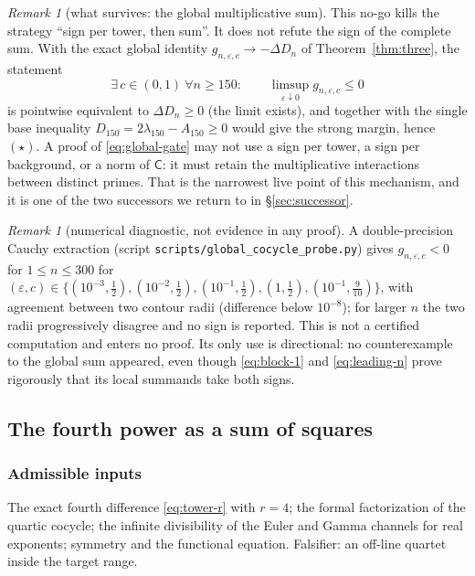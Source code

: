 \documentclass[11pt]{amsart}
\theoremstyle{definition}
\theoremstyle{remark}
\newtheorem{remark}[theorem]{Remark}
\theoremstyle{definition}
\newcommand{\eps}{\varepsilon}
\newcommand{\Cc}{\mathsf{C}}
\begin{document}
\begin{remark}[what survives: the global multiplicative sum]\label{rmk:tower-alive}
This no-go kills the strategy ``sign per tower, then sum''. It does not refute the sign of the
complete sum. With the exact global identity
$g_{n,\eps,c}\to-\Delta D_n$ of Theorem~\ref{thm:three}, the statement
\begin{equation}\label{eq:global-gate}
   \exists\,c\in(0,1)\ \forall n\ge150:\qquad
   \limsup_{\eps\downarrow0}g_{n,\eps,c}\le0
\end{equation}
is pointwise equivalent to $\Delta D_n\ge0$ (the limit exists), and together with the single base
inequality $D_{150}=2\lambda_{150}-A_{150}\ge0$ would give the strong margin, hence $(\star)$. A proof of \eqref{eq:global-gate}
may not use a sign per tower, a sign per background, or a norm of $\Cc$: it must retain the
multiplicative interactions between distinct primes. That is the narrowest live point of this
mechanism, and it is one of the two successors we return to in \S\ref{sec:successor}.
\end{remark}

\begin{remark}[numerical diagnostic, not evidence in any proof]\label{rmk:diag-global}
A double-precision Cauchy extraction (script \texttt{scripts/global\_cocycle\_probe.py}) gives
$g_{n,\eps,c}<0$ for $1\le n\le300$ for
$(\eps,c)\in\{(10^{-3},\tfrac12),(10^{-2},\tfrac12),(10^{-1},\tfrac12),(1,\tfrac12),
(10^{-1},\tfrac9{10})\}$, with agreement between two contour radii (difference below $10^{-8}$); for
larger $n$ the two radii progressively disagree and no sign is reported. This is not a certified computation and
enters no proof. Its only use is
directional: no counterexample to the global sum appeared, even though \eqref{eq:block-1} and
\eqref{eq:leading-n} prove rigorously that its local summands take both signs.
\end{remark}

\subsection{The fourth power as a sum of squares}\label{sec:sos}

\subsubsection*{Admissible inputs}
The exact fourth difference \eqref{eq:tower-r} with $r=4$; the formal factorization of the quartic
cocycle; the infinite divisibility of the Euler and Gamma channels for real exponents; symmetry
and the functional equation. Falsifier: an off-line quartet inside the target range.
\end{document}
